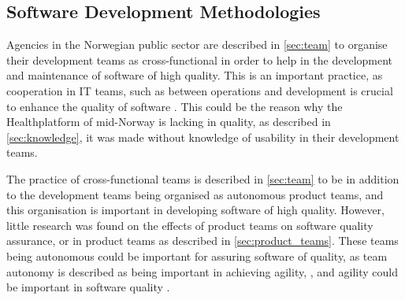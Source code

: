 

\subsection{Software Development Methodologies}
Agencies in the Norwegian public sector are described in \autoref{sec:team} to organise their development teams as cross-functional in order to help in the development and maintenance of software of high quality. This is an important practice, as cooperation in IT teams, such as between operations and development is crucial to enhance the quality of software \cite{aw_2019}. This could be the reason why the Healthplatform of mid-Norway is lacking in quality, as described in \autoref{sec:knowledge}, it was made without knowledge of usability in their development teams.

The practice of cross-functional teams is described in \autoref{sec:team} to be in addition to the development teams being organised as autonomous product teams, and this organisation is important in developing software of high quality. However, little research was found on the effects of product teams on software quality assurance, or in product teams as described in \autoref{sec:product_teams}. These teams being autonomous could be important for assuring software of quality, as team autonomy is described as being important in achieving agility, \cite{gl_2010}, and agility could be important in software quality \cite{mh_2004}.


